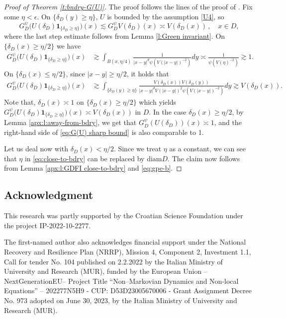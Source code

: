 \documentclass[12pt,a4paper,onecolumn]{article}
\theoremstyle{definition}
\newcommand{\1}{\mathbf 1}
\newcommand{\de}{\delta_D}
\newcommand{\GDP}{G_D^\psi}
\newcommand{\diam}{\textrm{diam}}
\numberwithin{equation}{section}
\begin{document}
    \begin{proof}[{Proof of Theorem \ref{t:bndry-G(U)}}]
    The proof follows the lines of the proof of \cite[Theorem 3.6]{Bio23cpaa}. Fix some $\eta<\epsilon$. On $\{\de(y)\ge \eta\}$, $U$ is bounded by the assumption \ref{U4}, so
		\begin{equation}\label{eq:gpe-b}
			\GDP \big(U(\de)\1_{\{\de\ge \eta\}}\big)(x)\lesssim\GDP V(\de)(x)\asymp V(\de(x))\,,\quad x\in D,
		\end{equation}
		where the last step estimate follows from Lemma \ref{l:Green invariant}. On $\{\de(x)\ge\eta/2\}$ we have
		\begin{align*}
			\GDP \big(U(\de)\1_{\{\de\ge \eta\}}\big)(x)&\gtrsim\int_{B(x,\eta/4)}\frac{1}{|x-y|^{d}\psi(V(|x-y|)^{-2})}dy\asymp \frac{1}{\psi(V(\eta)^{-2})}\gtrsim 1.
		\end{align*}
		On $\{\de(x)\le\eta/2\}$, since $|x-y|\ge \eta/2$, it holds that
		\begin{align*}
			\GDP \big(U(\de)\1_{\{\de\ge \eta\}}\big)(x)&\gtrsim \int_{\{\de(y)\ge \eta\}}\frac{V(\de(x))V(\de(y))}{|x-y|^{d}V(|x-y|)^2\psi(V(|x-y|)^{-2})}dy\gtrsim V(\de(x)).
		\end{align*}
		Note that, $\de(x)\asymp 1$ on $\{\de(x)\ge\eta/2\}$ which yields $\GDP \big(U(\de)\1_{\{\de\ge \eta\}}\big)(x)\asymp V(\de(x))$ in $D$. In the case $\de(x)\ge \eta/2$, by Lemma \ref{apx:l:away-from-bdry}, we get 
		that $\GDP(U(\de))(x)\asymp 1$, and the right-hand side of \eqref{eq:G(U) sharp bound} is also comparable to 1.
		
        Let us deal now with $\de(x)<\eta/2$. Since we treat $\eta$ as a constant, we can see that $\eta$ in \eqref{eq:close-to-bdry} can be replaced by $\diam D$. The claim now follows from Lemma \ref{apx:l:GDFI close-to-bdry} and \eqref{eq:gpe-b}.
	\end{proof}


\subsection*{Acknowledgment}
This research was partly supported by the Croatian Science Foundation under the project IP-2022-10-2277.

The first-named author also acknowledges financial support under the National Recovery and Resilience Plan (NRRP), Mission 4, Component 2, Investment 1.1, Call for tender No. 104 published on 2.2.2022 by the Italian Ministry of University and Research (MUR), funded by the European Union – NextGenerationEU– Project Title “Non–Markovian Dynamics and Non-local Equations” – 202277N5H9 - CUP: D53D23005670006 - Grant Assignment Decree No. 973 adopted on June 30, 2023, by the Italian Ministry of University and Research (MUR).
\end{document}
